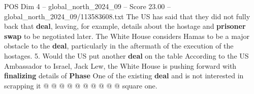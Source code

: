\begin{textsample}{POS Dim 4 – global\_north\_2024\_09 – Score 23.00 – global\_north\_2024\_09/113583608.txt}
The US has said that they did not fully back that \textbf{deal}, leaving, for example, details about the hostage and \textbf{prisoner} \textbf{swap} to be negotiated later.
The White House considers Hamas to be a major obstacle to the \textbf{deal}, particularly in the aftermath of the execution of the hostages. 5.
Would the US put another \textbf{deal} on the table According to the US Ambassador to Israel, Jack Lew, the White House is pushing forward with \textbf{finalizing} details of \textbf{Phase} One of the existing \textbf{deal} and is not interested in scrapping it @ @ @ @ @ @ @ @ @ @ square one.

\end{textsample}
